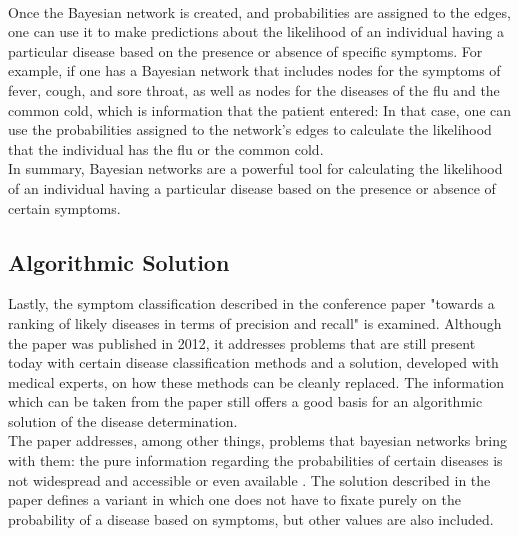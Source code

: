 \newline \\
Once the Bayesian network is created, and probabilities are assigned to the edges, one can use it to make predictions about the likelihood of an individual having a particular disease based on the presence or absence of specific symptoms. For example, if one has a Bayesian network that includes nodes for the symptoms of fever, cough, and sore throat, as well as nodes for the diseases of the flu and the common cold, which is information that the patient entered: In that case, one can use the probabilities assigned to the network's edges to calculate the likelihood that the individual has the flu or the common cold.
\newline \\
In summary, Bayesian networks are a powerful tool for calculating the likelihood of an individual having a particular disease based on the presence or absence of certain symptoms.

\subsection{Algorithmic Solution}
Lastly, the symptom classification described in the conference paper "towards a ranking of likely diseases in terms of precision and recall" \cite{.algo} is examined. Although the paper was published in 2012, it addresses problems that are still present today with certain disease classification methods and a solution, developed with medical experts, on how these methods can be cleanly replaced. The information which can be taken from the paper still offers a good basis for an algorithmic solution of the disease determination. 
\newline \\
The paper addresses, among other things, problems that bayesian networks bring with them: the pure information regarding the probabilities of certain diseases is not widespread and accessible or even available \cite{.algo}. The solution described in the paper defines a variant in which one does not have to fixate purely on the probability of a disease based on symptoms, but other values are also included.

